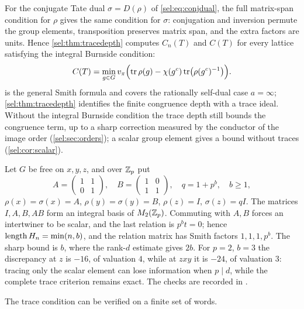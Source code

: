 For the conjugate Tate dual $\sigma=D(\rho)$ of \eqref{sel:eq:conjdual}, the
full matrix-span condition for $\rho$ gives the same condition for $\sigma$:
conjugation and inversion permute the group elements, transposition
preserves matrix span, and the extra factors are units. Hence
\cref{sel:thm:tracedepth} computes $C_n(T)$ and $C(T)$ for every lattice
satisfying the integral Burnside condition:
\begin{equation}\label{sel:eq:Ctrace}
 C(T)=\min_{g\in G}v_\pi\Bigl(\operatorname{tr}\rho(g)-\chi(g^c)\operatorname{tr}\bigl(\rho(g^c)^{-1}\bigr)\Bigr).
\end{equation}
 is the general Smith formula and covers the rationally
self-dual case $a=\infty$; \cref{sel:thm:tracedepth} identifies the finite
congruence depth with a trace ideal. Without the integral Burnside
condition the trace depth still bounds the congruence term, up to a sharp
correction measured by the conductor of the image order
(\cref{sel:sec:orders}); a scalar group element gives a bound without
traces (\cref{sel:cor:scalar}).

\begin{example}\label{sel:ex:tracemodel}
Let $G$ be free on $x,y,z$, and over $\mathbb{Z}_p$ put
\[
 A=\begin{pmatrix}1&1\\0&1\end{pmatrix},\quad
 B=\begin{pmatrix}1&0\\1&1\end{pmatrix},\quad q=1+p^b,\quad b\ge1 ,
\]
$\rho(x)=\sigma(x)=A$, $\rho(y)=\sigma(y)=B$, $\rho(z)=I$,
$\sigma(z)=qI$. The matrices $I,A,B,AB$ form an integral basis of
$M_2(\mathbb{Z}_p)$. Commuting with $A,B$ forces an intertwiner to be scalar, and
the last relation is $p^bt=0$; hence $\operatorname{length} H_n=\min(n,b)$, and the
relation matrix has Smith factors $1,1,1,p^b$. The sharp bound is $b$, where
the rank-$d$ estimate gives $2b$. For $p=2$, $b=3$ the discrepancy at $z$ is
$-16$, of valuation $4$, while at $zxy$ it is $-24$, of valuation $3$:
tracing only the scalar element can lose information when $p\mid d$, while
the complete trace criterion remains exact. The checks are recorded in
.
\end{example}

The trace condition can be verified on a finite set of words.

